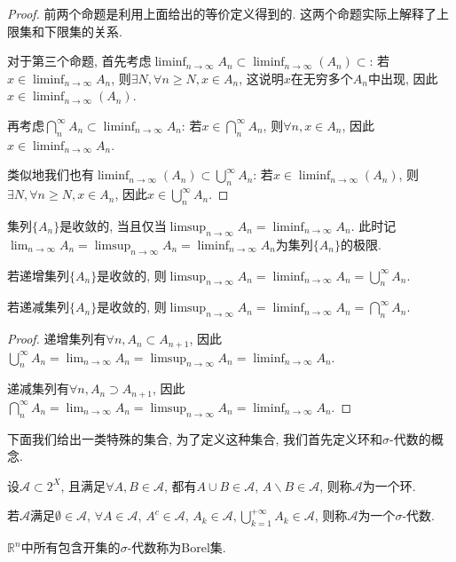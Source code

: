 \documentclass[theorem=false,mathfont=none,openany,sub3section]{easybook}
\begin{document}
\begin{proof}
  前两个命题是利用上面给出的等价定义得到的. 这两个命题实际上解释了上限集和下限集的关系.\par
  对于第三个命题, 首先考虑$\liminf_{n \to \infty}A_n\subset \liminf_{n \to \infty}(A_n)\subset$: 若$x\in \liminf_{n \to \infty}A_n$, 则$\exists N, \forall n\geqslant N, x\in A_n$, 这说明$x$在无穷多个$A_n$中出现, 因此$x\in \liminf_{n \to \infty}(A_n)$.\par
  再考虑$\bigcap_{n}^{\infty}A_n \subset \liminf_{n \to \infty}A_n$: 若$x\in \bigcap_{n}^{\infty}A_n$, 则$\forall n, x\in A_n$, 因此$x\in \liminf_{n \to \infty}A_n$.\par
  类似地我们也有$\liminf_{n \to \infty}(A_n)\subset \bigcup_{n}^{\infty}A_n$: 若$x\in \liminf_{n \to \infty}(A_n)$, 则$\exists N, \forall n\geqslant N, x\in A_n$, 因此$x\in \bigcup_{n}^{\infty}A_n$.\par
\end{proof}

\begin{definition}
  集列$\{A_n\}$是收敛的, 当且仅当$\limsup_{n \to \infty}A_n=\liminf_{n \to \infty}A_n$. 此时记$\lim_{n \to \infty} A_n=\limsup_{n \to \infty}A_n=\liminf_{n \to \infty}A_n$为集列$\{A_n\}$的极限.\par
\end{definition}

\begin{corollary}
  若递增集列$\{A_n\}$是收敛的, 则$\limsup_{n \to \infty}A_n=\liminf_{n \to \infty}A_n=\bigcup_{n}^{\infty}A_n$.\par
  若递减集列$\{A_n\}$是收敛的, 则$\limsup_{n \to \infty}A_n=\liminf_{n \to \infty}A_n=\bigcap_{n}^{\infty}A_n$.\par
\end{corollary}
\begin{proof}
  递增集列有$\forall n, A_n\subset A_{n+1}$, 因此$\bigcup_{n}^{\infty}A_n=\lim_{n \to \infty}A_n =\limsup_{n \to \infty}A_n=\liminf_{n \to \infty}A_n$.\par
  递减集列有$\forall n, A_n\supset A_{n+1}$, 因此$\bigcap_{n}^{\infty}A_n=\lim_{n \to \infty}A_n =\limsup_{n \to \infty}A_n=\liminf_{n \to \infty}A_n$.\par
\end{proof}

下面我们给出一类特殊的集合, 为了定义这种集合, 我们首先定义环和$\sigma$-代数的概念.\par

\begin{definition}
  设$\mathcal{A}\subset 2^{X}$, 且满足$\forall A,B\in \mathcal{A}$, 都有$A\cup B\in \mathcal{A}$, $A\backslash B\in \mathcal{A}$, 则称$\mathcal{A}$为一个环.\par
  若$\mathcal{A}$满足$\emptyset\in \mathcal{A}$, $\forall A\in \mathcal{A}$, $A^{c}\in \mathcal{A}$, $A_k \in \mathcal{A}, \bigcup_{k=1}^{+\infty}A_k\in \mathcal{A}$, 则称$\mathcal{A}$为一个$\sigma$-代数.\par
  $\mathbb{R}^n$中所有包含开集的$\sigma$-代数称为Borel集.\par
\end{definition}
\end{document}
